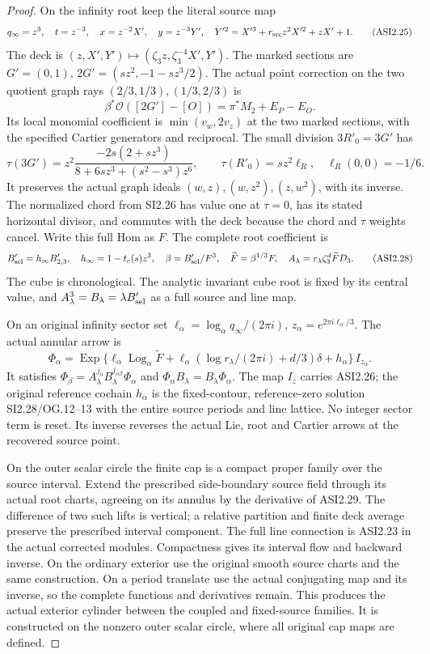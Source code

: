 \begin{proof}
On the infinity root keep the literal source map
\[
 q_\infty=z^3,\quad t=z^{-3},\quad
 x=z^{-2}X',\quad y=z^{-3}Y',\quad
 Y'^2=X'^3+r_{\rm src}z^2X'^2+zX'+1.
 \tag{ASI2.25}
\]
The deck is
\((z,X',Y')\mapsto(\zeta_3z,\zeta_3^{-4}X',Y')\).
The marked sections are
\(G'=(0,1)\), \(2G'=(sz^2,-1-sz^3/2)\).
The actual point correction on the two quotient graph
rays \((2/3,1/3),(1/3,2/3)\) is
\[
       \beta^*\mathcal O([2G']-[O])
                    =\pi^*M_2+E_P-E_O.
 \tag{ASI2.26}
\]
Its local monomial coefficient is
\(\min(v_w,2v_z)\) at the two marked sections,
with the specified Cartier generators and reciprocal.
The small division \(3R'_0=3G'\) has
\[
 \tau(3G')=
 z^2\frac{-2s(2+sz^3)}
 {8+6sz^3+(s^2-s^3)z^6},\qquad
 \tau(R'_0)=sz^2\ell_R,\quad\ell_R(0,0)=-1/6.
 \tag{ASI2.27}
\]
It preserves the actual graph ideals
\((w,z),(w,z^2),(z,w^2)\), with its inverse.
The normalized chord from SI2.26 has value one at
\(\tau=0\), has its stated horizontal divisor, and
commutes with the deck because the chord and
\(\tau\) weights cancel. Write this full Hom as \(F\).
The complete root coefficient is
\[
 B'_{\rm sel}=h_\infty B'_{2,3},\quad
 h_\infty=1-t_c(s)z^3,\quad
 \beta=B'_{\rm sel}/F^3,\quad
 \widetilde F=\beta^{1/3}F,\quad
 A_\lambda=r_\lambda\zeta_3^d\widetilde F D_3 .
 \tag{ASI2.28}
\]
The cube is chronological. The analytic invariant
cube root is fixed by its central value, and
\(A_\lambda^3=B_\lambda=\lambda B'_{\rm sel}\)
as a full source and line map.

On an original infinity sector set
\(\ell_\alpha=\log_\alpha q_\infty/(2\pi i)\),
\(z_\alpha=e^{2\pi i\ell_\alpha/3}\). The actual
annular arrow is
\[
 \Phi_\alpha=
 \operatorname{Exp}\{\ell_\alpha\operatorname{Log}_\alpha
       \widetilde F+
       \ell_\alpha(\log r_\lambda/(2\pi i)+d/3)\delta
       +h_\alpha\}\,I_{z_\alpha}.
 \tag{ASI2.29}
\]
It satisfies
\(\Phi_\beta=A_\lambda^{j_0}
B_\lambda^{j_{\alpha\beta}}\Phi_\alpha\) and
\(\Phi_\alpha B_\lambda=B_\lambda\Phi_\alpha\).
The map \(I_z\) carries ASI2.26; the original reference
cochain \(h_\alpha\) is the fixed-contour, reference-zero
solution SI2.28/OG.12--13 with the entire source periods
and line lattice. No integer sector term is reset.
Its inverse reverses the actual Lie, root and
Cartier arrows at the recovered source point.

On the outer scalar circle the finite cap is a compact
proper family over the source interval. Extend the
prescribed side-boundary source field through its
actual root charts, agreeing on its annulus by the
derivative of ASI2.29. The difference of two such
lifts is vertical; a relative partition and finite
deck average preserve the prescribed interval
component. The full line connection is ASI2.23 in
the actual corrected modules. Compactness gives
its interval flow and backward inverse. On the
ordinary exterior use the original smooth source
charts and the same construction. On a period
translate use the actual conjugating map and its
inverse, so the complete functions and derivatives
remain. This produces the actual exterior cylinder
between the coupled and fixed-source families.
It is constructed on the nonzero outer scalar
circle, where all original cap maps are defined.


\end{proof}
